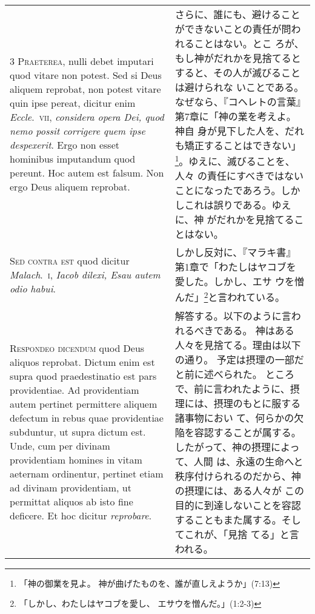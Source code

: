 \documentclass[10pt]{jsarticle} %
\begin{document}
\begin{longtable}{p{21em}p{21em}}
 

\\


{\scshape  3 Praeterea}, nulli debet imputari quod vitare
non potest. Sed si Deus aliquem reprobat, non potest vitare quin ipse
pereat, dicitur enim {\itshape Eccle}.~{\scshape vii}, {\itshape considera opera Dei, quod nemo possit
corrigere quem ipse despexerit}. Ergo non esset hominibus imputandum quod
pereunt. Hoc autem est falsum. Non ergo Deus aliquem reprobat.


&

さらに、誰にも、避けることができないことの責任が問われることはない。とこ
 ろが、もし神がだれかを見捨てるとすると、その人が滅びることは避けられな
 いことである。なぜなら、『コヘレトの言葉』第7章に「神の業を考えよ。神自
 身が見下した人を、だれも矯正することはできない」\footnote{「神の御業を見よ。
 神が曲げたものを、誰が直しえようか」(7:13)}。ゆえに、滅びることを、人々
 の責任にすべきではないことになったであろう。しかしこれは誤りである。ゆえに、神
がだれかを見捨てることはない。
 

\\


{\scshape Sed contra est} quod dicitur {\itshape Malach}.~{\scshape i},
 {\itshape Iacob dilexi, Esau autem odio habui}.


&

 しかし反対に、『マラキ書』第1章で「わたしはヤコブを愛した。しかし、エサ
 ウを憎んだ」\footnote{「しかし、わたしはヤコブを愛し、
 エサウを憎んだ。」(1:2-3)}と言われている。

\\


{\scshape Respondeo dicendum} quod Deus aliquos
reprobat. Dictum enim est supra quod praedestinatio est pars
providentiae. Ad providentiam autem pertinet permittere aliquem defectum
in rebus quae providentiae subduntur, ut supra dictum est. Unde, cum per
divinam providentiam homines in vitam aeternam ordinentur, pertinet
etiam ad divinam providentiam, ut permittat aliquos ab isto fine
 deficere. Et hoc dicitur {\itshape reprobare}.

 &

 解答する。以下のように言われるべきである。
 神はある人々を見捨てる。理由は以下の通り。
 予定は摂理の一部だと前に述べられた。
 ところで、前に言われたように、摂理には、摂理のもとに服する諸事物におい
 て、何らかの欠陥を容認することが属する。したがって、神の摂理によって、人間
 は、永遠の生命へと秩序付けられるのだから、神の摂理には、ある人々が
 この目的に到達しないことを容認することもまた属する。そしてこれが、「見捨
 てる」と言われる。


\end{longtable}
\end{document}
